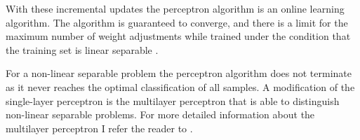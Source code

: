 With these incremental updates the perceptron algorithm is an online learning algorithm.
The algorithm is guaranteed to converge, and there is a limit for the maximum number of weight adjustments while trained under the condition that the training set is linear separable \cite{2016Perceptron}. %

For a non-linear separable problem the perceptron algorithm does not terminate as it never reaches the optimal classification of all samples. %
A modification of the single-layer perceptron is the multilayer perceptron that is able to distinguish non-linear separable problems.
For more detailed information about the multilayer perceptron I refer the reader to \cite{2017MultilayerPerceptron}.











